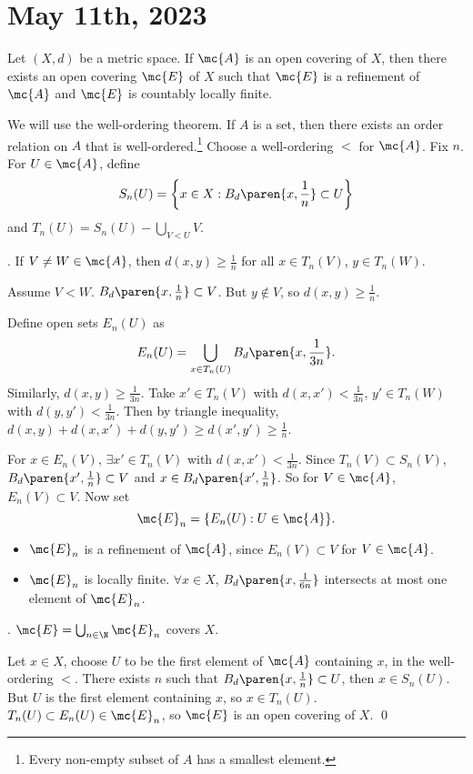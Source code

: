 \section*{May 11th, 2023}

 Let \((X, d)\) be a metric space. If \(\mc{A}\) is an open covering of \(X\), then there exists an open covering \(\mc{E}\) of \(X\) such that \(\mc{E}\) is a refinement of \(\mc{A}\) and \(\mc{E}\) is countably locally finite.

\pf We will use the well-ordering theorem. If \(A\) is a set, then there exists an order relation on \(A\) that is well-ordered.\footnote{Every non-empty subset of \(A\) has a smallest element.} Choose a well-ordering \(<\) for \(\mc{A}\). Fix \(n\). For \(U \in \mc{A}\), define
\[
    S_n(U) = \left\{x \in X : B_d\paren{x, \frac{1}{n}} \subset U\right\}
\]
and \(T_n(U) = S_n(U) - \bigcup_{V < U} V\).

\quad \claim. If \(V \neq W \in \mc{A}\), then \(d(x, y) \geq \frac{1}{n}\) for all \(x \in T_n(V)\), \(y \in T_n(W)\).

\quad \pf Assume \(V < W\). \(B_d\paren{x, \frac{1}{n}} \subset V\). But \(y \notin V\), so \(d(x, y) \geq \frac{1}{n}\).

Define open sets \(E_n(U)\) as
\[
    E_n(U) = \bigcup_{x \in T_n(U)} B_d\paren{x, \frac{1}{3n}}.
\]
Similarly, \(d(x, y) \geq \frac{1}{3n}\). Take \(x' \in T_n(V)\) with \(d(x, x') < \frac{1}{3n}\), \(y' \in T_n(W)\) with \(d(y, y') < \frac{1}{3n}\). Then by triangle inequality, \(d(x, y) + d(x, x') + d(y, y') \geq d(x', y') \geq \frac{1}{n}\).

For \(x \in E_n(V)\), \(\exists x' \in T_n(V)\) with \(d(x, x') < \frac{1}{3n}\). Since \(T_n(V) \subset S_n(V)\), \(B_d\paren{x', \frac{1}{n}} \subset V\) and \(x \in B_d\paren{x', \frac{1}{n}}\). So for \(V \in \mc{A}\), \(E_n(V) \subset V\). Now set
\[
    \mc{E}_n = \{E_n(U) : U \in \mc{A}\}.
\]
\begin{itemize}
    \item \(\mc{E}_n\) is a refinement of \(\mc{A}\), since \(E_n(V) \subset V\) for \(V \in \mc{A}\).
    \item \(\mc{E}_n\) is locally finite. \(\forall x \in X\), \(B_d\paren{x, \frac{1}{6n}}\) intersects at most one element of \(\mc{E}_n\).
\end{itemize}

\quad \claim. \(\mc{E} = \bigcup_{n \in \N} \mc{E}_n\) covers \(X\).

\quad \pf Let \(x \in X\), choose \(U\) to be the first element of \(\mc{A}\) containing \(x\), in the well-ordering \(<\). There exists \(n\) such that \(B_d\paren{x, \frac{1}{n}} \subset U\), then \(x \in S_n(U)\). But \(U\) is the first element containing \(x\), so \(x \in T_n(U)\). \(T_n(U) \subset E_n(U) \in \mc{E}_n\), so \(\mc{E}\) is an open covering of \(X\). \qed

